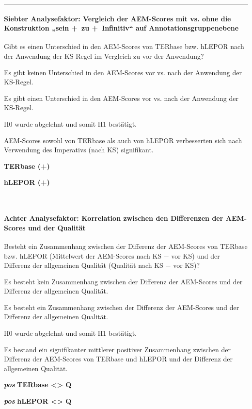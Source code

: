 \hrule
\paragraph*{Siebter Analysefaktor: Vergleich der AEM-Scores mit vs. ohne die Konstruktion „sein +~zu +~Infinitiv“ auf Annotationsgruppenebene}
\begin{description}[font=\normalfont\bfseries]
\item [Fragestellung:] Gibt es einen Unterschied in den AEM-Scores von TERbase bzw. hLEPOR nach der Anwendung der KS-Regel im Vergleich zu vor der Anwendung?
\item [H0 --] Es gibt keinen Unterschied in den AEM-Scores vor vs. nach der Anwendung der KS-Regel.
\item [H1 --] Es gibt einen Unterschied in den AEM-Scores vor vs. nach der Anwendung der KS-Regel.
\item [Resultat]
\end{description}
\noindent
\parbox[t]{.75\textwidth}{
H0 wurde abgelehnt und somit H1 bestätigt.

AEM-Scores sowohl von TERbase als auch von hLEPOR verbesserten sich nach Verwendung des Imperativs (nach KS) signifikant.
}
\parbox[t]{.04\textwidth}{}
\colorbox{smGreen}{\parbox[t]{.2\textwidth}{
{ \textbf{TERbase (+)}}

 \textbf{hLEPOR (+)}\\
 \\
}}

\hrule
\paragraph*{Achter Analysefaktor: Korrelation zwischen den Differenzen der AEM-Scores und der Qualität}
\begin{description}[font=\normalfont\bfseries]
\item [Fragestellung:] Besteht ein Zusammenhang zwischen der Differenz der AEM-Scores von TERbase bzw. hLEPOR (Mittelwert der AEM-Scores nach KS $-$ vor KS) und der Differenz der allgemeinen Qualität (Qualität nach KS $-$ vor KS)?
\item [H0 --] Es besteht kein Zusammenhang zwischen der Differenz der AEM-Scores und der Differenz der allgemeinen Qualität.
\item [H1 --] Es besteht ein Zusammenhang zwischen der Differenz der AEM-Scores und der Differenz der allgemeinen Qualität.
\item [Resultat]
\end{description}
\noindent
\parbox[t]{.7\textwidth}{
H0 wurde abgelehnt und somit H1 bestätigt.

Es bestand ein signifikanter mittlerer positiver Zusammenhang zwischen der Differenz der AEM-Scores von TERbase und hLEPOR und der Differenz der allgemeinen Qualität.
}
\parbox[t]{.04\textwidth}{}
\colorbox{smGreen}{\parbox[t]{.25\textwidth}{
{ \textbf{\textit{pos}} \textbf{TERbase <> Q}}

 \textbf{\textit{pos}} \textbf{hLEPOR <> Q}\\
 \\
 \\
}}





